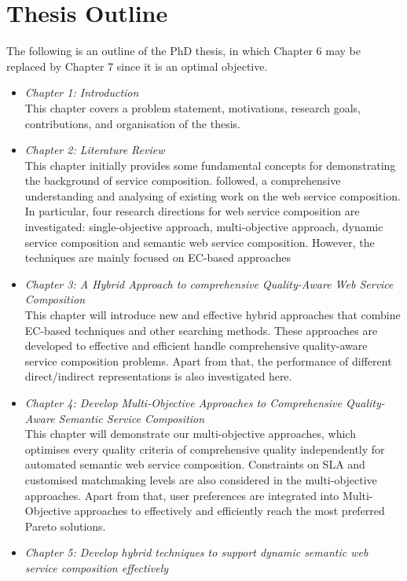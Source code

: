 \section{Thesis Outline}

The following is an outline of the PhD thesis,  in which Chapter 6 may be replaced by Chapter 7 since it is an optimal objective.

\begin{itemize}
 \item \textit{Chapter 1: Introduction}\\
 This chapter covers a problem statement, motivations, research goals, contributions, and organisation of the thesis.
 \item \textit{Chapter 2: Literature Review}\\
This chapter initially provides some fundamental concepts for demonstrating the background of service composition. followed, a comprehensive understanding and analysing of existing work on the web service composition.  In particular, four research directions for web service composition are investigated: single-objective approach, multi-objective approach, dynamic service composition and semantic web service composition.  However, the techniques are mainly focused on EC-based approaches
 \item \textit{Chapter 3: A Hybrid Approach to comprehensive Quality-Aware Web Service Composition}\\
This chapter will introduce new and effective hybrid approaches that combine EC-based techniques and other searching methods. These approaches are developed to effective and efficient handle comprehensive quality-aware service composition problems. Apart from that, the performance of different direct/indirect representations is also investigated here.
 \item \textit{Chapter 4: Develop Multi-Objective Approaches to Comprehensive Quality-Aware Semantic Service Composition}\\
This chapter will demonstrate our multi-objective approaches, which optimises every quality criteria of comprehensive quality independently for automated semantic web service composition. Constraints on SLA and customised matchmaking levels are also considered in the multi-objective approaches. Apart from that, user preferences are integrated into Multi-Objective approaches to effectively and efficiently reach the most preferred Pareto solutions.
 \item \textit{Chapter 5: Develop hybrid techniques to support dynamic semantic web service composition effectively}\\

\end{itemize}
